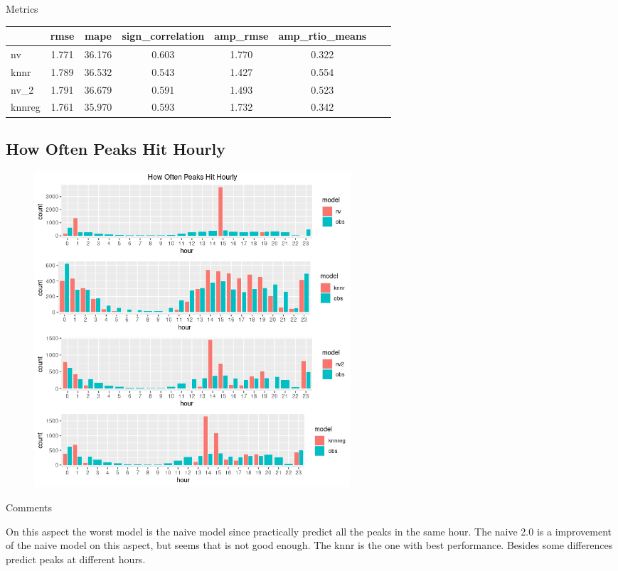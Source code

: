 \documentclass[xcolor=dvipsnames]{beamer}
\begin{document}
    \begin{frame}{Metrics}
        \begin{table}[htbp]
            \centering
            \begin{tabular}{|l|c|c|c|c|c|c|c|}
            \hline
            & rmse & mape & sign\_correlation & amp\_rmse & amp\_rtio\_means   \\
            \hline
            nv & 1.771 & 36.176 & 0.603 & 1.770 & 0.322  \\
            knnr & 1.789 & 36.532 & 0.543 & 1.427 & 0.554 \\
            nv\_2 & 1.791 & 36.679 & 0.591 & 1.493 & 0.523   \\
            knnreg & 1.761 & 35.970 & 0.593 & 1.732 & 0.342 \\
            \hline
            \end{tabular}
            \label{tab:metrics}
        \end{table}
    \end{frame}

    \subsection{How Often Peaks Hit Hourly}
    \begin{frame}{}
        \begin{figure}
            \centering
                 \includegraphics[width=0.57\textwidth]{images/hourly.png}
       \end{figure}
    \end{frame}
    \begin{frame}{Comments}
        \begin{outline}
            \1 On this aspect the worst model is the naive model since practically predict all the peaks in the same hour.
                \2 The naive 2.0 is a improvement of the naive model on this aspect, but seems that is not good enough.
            \1 The knnr is the one with best performance. Besides some differences predict peaks at different hours.
        \end{outline}
        
    \end{frame}
\end{document}
